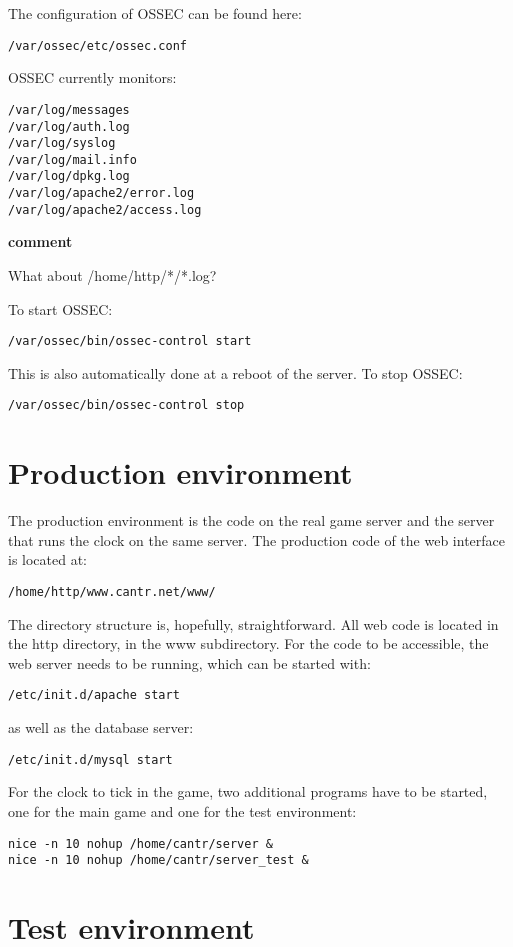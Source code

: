 \documentclass[a4paper,12pt]{article}
\newcommand{\comment}[1]{\begin{center}\colorbox{commentcol}{\begin{minipage}{\textwidth}\begin{center}{\bf comment}\end{center}#1\end{minipage}}\end{center}}
\begin{document}
The configuration of OSSEC can be found here:
\begin{verbatim}
/var/ossec/etc/ossec.conf
\end{verbatim}

OSSEC currently monitors:
\begin{verbatim}
/var/log/messages
/var/log/auth.log
/var/log/syslog
/var/log/mail.info
/var/log/dpkg.log
/var/log/apache2/error.log
/var/log/apache2/access.log
\end{verbatim}

\comment{What about /home/http/*/*.log?}

To start OSSEC:
\begin{verbatim}
/var/ossec/bin/ossec-control start
\end{verbatim}
This is also automatically done at a reboot of the server. To stop OSSEC:
\begin{verbatim}
/var/ossec/bin/ossec-control stop
\end{verbatim}

\section{Production environment}

The production environment is the code on the real game server and the server that runs the clock on the same server. The production code of the web interface is located at:
\begin{verbatim}
/home/http/www.cantr.net/www/
\end{verbatim}
The directory structure is, hopefully, straightforward. All web code is located in the http directory, in the www subdirectory. For the code to be accessible, the web server needs to be running, which can be started with:
\begin{verbatim}
/etc/init.d/apache start
\end{verbatim}
as well as the database server:
\begin{verbatim}
/etc/init.d/mysql start
\end{verbatim}

For the clock to tick in the game, two additional programs have to be started, one for the main game and one for the test environment:
\begin{verbatim}
nice -n 10 nohup /home/cantr/server &
nice -n 10 nohup /home/cantr/server_test &
\end{verbatim}

\section{Test environment}
\end{document}
